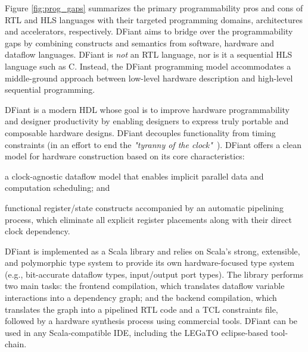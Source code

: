Figure \ref{fig:prog_gaps} summarizes the primary programmability pros and cons of RTL and HLS languages with their targeted programming domains, architectures and accelerators, respectively. DFiant aims to bridge over the programmability gaps by combining constructs and semantics from software, hardware and dataflow languages. DFiant is \emph{not} an RTL language, nor is it a sequential HLS language such as C. Instead, the DFiant programming model accommodates a middle-ground approach between low-level hardware description and high-level sequential programming.   

DFiant is a modern HDL whose goal is to improve hardware programmability and designer productivity by enabling designers to express truly portable and composable hardware designs.
DFiant decouples functionality from timing constraints (in an effort to end the \emph{"tyranny of the clock"}~\cite{Sutherland2012}). DFiant offers a clean model for hardware construction based on its core characteristics:
\begin{enumerate*}[label=(\roman*)]
\item
  a clock-agnostic dataflow model that enables implicit parallel data and computation scheduling; and
\item
  functional register/state constructs accompanied by an automatic pipelining process, which eliminate all explicit register placements along with their direct clock dependency.
\end{enumerate*}   

DFiant is implemented as a Scala library and relies on Scala's strong, extensible, and polymorphic type system to provide its own hardware-focused type system (e.g., bit-accurate dataflow types, input/output port types). The library performs two main tasks: the frontend compilation, which translates dataflow variable interactions into a dependency graph; and the backend compilation, which translates the graph into a pipelined RTL code and a TCL constraints file, followed by a hardware synthesis process using commercial tools. DFiant can be used in any Scala-compatible IDE, including the LEGaTO eclipse-based tool-chain.




